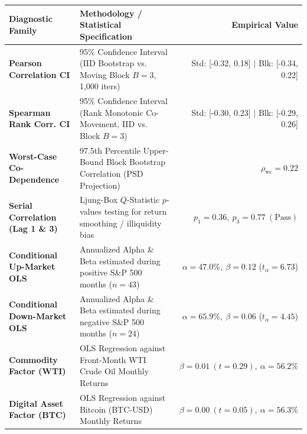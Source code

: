 \documentclass[10pt,a4paper]{article}
\begin{document}
\vspace{0.45em}

\begin{tcolorbox}[colback=white, colframe=primary, title=\textbf{\small\strut Appendix A: Extended Statistical, Bootstrap \& Factor Diagnostics}, fonttitle=\sffamily\bfseries\small, arc=5pt, boxrule=0.8pt, toptitle=4pt, bottomtitle=4pt, left=6pt, right=6pt, top=3.5pt, bottom=3.5pt, colbacktitle=primary]
\renewcommand{\arraystretch}{1.22}
\scriptsize
\begin{tabularx}{\textwidth}{l X r}
\toprule
\textbf{\textcolor{primary}{Diagnostic Family}} & \textbf{\textcolor{primary}{Methodology / Statistical Specification}} & \textbf{\textcolor{primary}{Empirical Value}} \\
\midrule
\textbf{Pearson Correlation CI} & 95\% Confidence Interval (IID Bootstrap vs. Moving Block $B=3$, 1,000 iters) & Std: [-0.32, 0.18] $\vert$ Blk: [-0.34, 0.22] \\
\rowcolor{cardbg} \textbf{Spearman Rank Corr. CI} & 95\% Confidence Interval (Rank Monotonic Co-Movement, IID vs. Block $B=3$) & Std: [-0.30, 0.23] $\vert$ Blk: [-0.29, 0.26] \\
\textbf{Worst-Case Co-Dependence} & 97.5th Percentile Upper-Bound Block Bootstrap Correlation (PSD Projection) & $\rho_{\text{wc}} = 0.22$ \\
\rowcolor{cardbg} \textbf{Serial Correlation (Lag 1 \& 3)} & Ljung-Box $Q$-Statistic $p$-values testing for return smoothing / illiquidity bias & $p_1=0.36,\ p_3=0.77\ (\text{Pass})$ \\
\textbf{Conditional Up-Market OLS} & Annualized Alpha \& Beta estimated during positive S\&P 500 months ($n=43$) & $\alpha=47.0\%,\ \beta=0.12$ ($t_\alpha=6.73$) \\
\rowcolor{cardbg} \textbf{Conditional Down-Market OLS} & Annualized Alpha \& Beta estimated during negative S\&P 500 months ($n=24$) & $\alpha=65.9\%,\ \beta=0.06$ ($t_\alpha=4.45$) \\
\textbf{Commodity Factor (WTI)} & OLS Regression against Front-Month WTI Crude Oil Monthly Returns & $\beta=0.01\ (t=0.29),\ \alpha=56.2\%$ \\
\rowcolor{cardbg} \textbf{Digital Asset Factor (BTC)} & OLS Regression against Bitcoin (BTC-USD) Monthly Returns & $\beta=0.00\ (t=0.05),\ \alpha=56.3\%$ \\
\bottomrule
\end{tabularx}
\end{tcolorbox}
\end{document}
